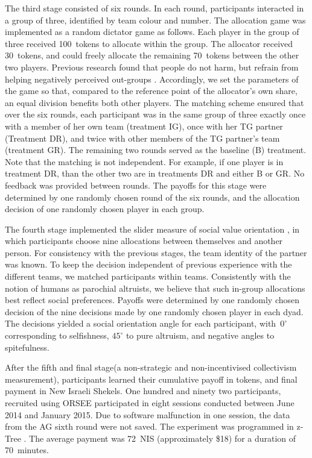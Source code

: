 \documentclass[12pt,a4paper]{article}
\begin{document}
The third stage consisted of six rounds. In each round, participants
interacted in a group of three, identified by team colour and number.
The allocation game was implemented as a random dictator game as follows.
Each player in the group of three received 100~tokens to allocate
within the group. The allocator received 30~tokens, and could freely
allocate the remaining 70~tokens between the other two players. Previous
research found that people do not harm, but refrain from helping negatively
perceived out-groups \citep{weisel2015ingroup}. Accordingly, we set
the parameters of the game so that, compared to the reference point
of the allocator's own share, an equal division benefits both other
players. The matching scheme ensured that over the six rounds, each
participant was in the same group of three exactly once with a member
of her own team (treatment IG), once with her TG partner (Treatment
DR), and twice with other members of the TG partner's team (treatment
GR). The remaining two rounds served as the baseline (B) treatment.
Note that the matching is not independent. For example, if one player
is in treatment DR, than the other two are in treatments DR and either
B or GR. No feedback was provided between rounds. The payoffs for
this stage were determined by one randomly chosen round of the six
rounds, and the allocation decision of one randomly chosen player
in each group.

The fourth stage implemented the slider measure of social value orientation
\citep*{murphy2011measuring,crosetto2012flexible}, in which participants
choose nine allocations between themselves and another person. For
consistency with the previous stages, the team identity of the partner
was known. To keep the decision independent of previous experience
with the different teams, we matched participants within teams. Consistently
with the notion of humans as parochial altruists, we believe that
such in-group allocations best reflect social preferences. Payoffs
were determined by one randomly chosen decision of the nine decisions
made by one randomly chosen player in each dyad. The decisions yielded
a social orientation angle for each participant, with~$0^{\circ}$
corresponding to selfishness, $45^{\circ}$ to pure altruism, and
negative angles to spitefulness.

After the fifth and final stage(a non-strategic and non-incentivised
collectivism measurement), participants learned their cumulative payoff
in tokens, and final payment in New Israeli Shekels. One hundred
and ninety two participants, recruited using ORSEE \citep*{greiner2015subject}
participated in eight sessions conducted between June 2014 and January
2015. Due to software malfunction in one session, the data from the
AG sixth round were not saved. The experiment was programmed in z-Tree
\citep*{Fischbacher2007}. The average payment was 72~NIS (approximately
\$18) for a duration of 70~minutes.
\end{document}
